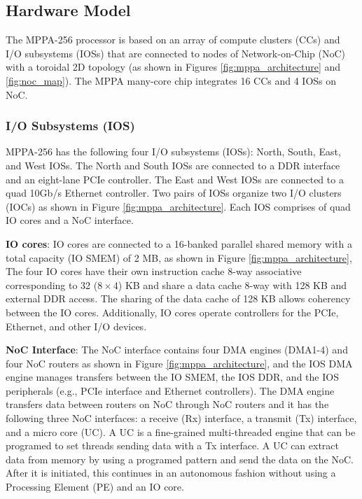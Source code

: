 \documentclass[conference,compsoc]{IEEEtran}
\newcommand{\comment}[1]{}
\begin{document}
\vspace{-3mm}
\subsection{Hardware Model}
\label{sec:hardware_model}
\vspace{-3mm}
The MPPA-256 processor is based on an array of compute clusters (CCs) and I/O subsystems (IOSs) that are connected to nodes of Network-on-Chip (NoC) with a toroidal 2D topology 
(as shown in Figures \ref{fig:mppa_architecture} and \ref{fig:noc_map}).
The MPPA many-core chip integrates 16 CCs and 4 IOSs on NoC.

\vspace{-2mm}
\subsubsection{I/O Subsystems (IOS)}
\label{sec:ios}
MPPA-256 has the following four I/O subsystems (IOSs): North, South, East, and West IOSs.
The North and South IOSs are connected to a DDR interface and an eight-lane PCIe controller.
The East and West IOSs are connected to a quad 10Gb/s Ethernet controller.
Two pairs of IOSs organize two I/O clusters (IOCs) as shown in Figure \ref{fig:mppa_architecture}.
Each IOS comprises of quad IO cores and a NoC interface.

\textbf{IO cores}: IO cores are connected to a 16-banked parallel shared memory with a total capacity (IO SMEM) of 2 MB, as shown in Figure \ref{fig:mppa_architecture},
The four IO cores have their own instruction cache 8-way associative corresponding to 32 ($8 \times 4$) KB and share a data cache 8-way with 128 KB and external DDR access.
The sharing of the data cache of 128 KB allows coherency between the IO cores.
Additionally, IO cores operate controllers for the PCIe, Ethernet, \comment{1-11}and other I/O devices.

\textbf{NoC Interface}: The NoC interface contains four DMA engines (DMA1-4) and four NoC routers as shown in Figure \ref{fig:mppa_architecture}, and the IOS DMA engine manages transfers between the IO SMEM, the IOS DDR, and the IOS peripherals (e.g., PCIe interface and Ethernet controllers).
The DMA engine transfers data between routers on NoC through NoC routers and it has the following three NoC interfaces: a receive (Rx) interface, a transmit (Tx) interface, and a micro core (UC).
A UC is a fine-grained multi-threaded engine that can be programed to set threads sending data with a Tx interface.
A UC can extract data from memory by using a programed pattern and send the data on the NoC.
After it is initiated, this continues in an autonomous fashion without using a Processing Element (PE) and an IO core.
\end{document}
